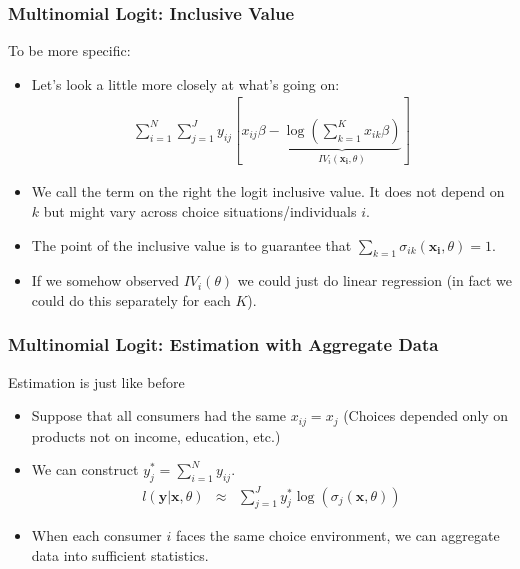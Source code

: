 \documentclass[aspectratio=169,11pt]{beamer}
\begin{document}
\begin{frame}
\frametitle{Multinomial Logit: Inclusive Value}
To be more specific:
\begin{itemize}
\item Let's look a little more closely at what's going on:
\begin{eqnarray*}
\sum_{i=1}^N \sum_{j=1}^J  y_{ij} \left[ x_{ij} \beta - \underbrace{\log \left(\sum_{k=1}^K x_{ik} \beta  \right)}_{IV_i(\symbf{x_i},\theta)} \right]
\end{eqnarray*}
\item We call the term on the right the \alert{logit inclusive value}. It does not depend on $k$ but might vary across choice situations/individuals $i$.
\item The point of the inclusive value is to guarantee that $\sum_{k=1} \sigma_{ik}(\symbf{x_i},\theta) = 1$.
\item If we somehow observed $IV_i(\theta)$ we could just do linear regression (in fact we could do this separately for each $K$).
\end{itemize}
\end{frame}


\begin{frame}
\frametitle{Multinomial Logit: Estimation with Aggregate Data}
Estimation is just like before
\begin{itemize}
\item  Suppose that all consumers had the same $x_{ij} = x_{j}$ (Choices depended only on products not on income, education, etc.)
\item We can construct $y_{j}^* = \sum_{i=1}^N y_{ij}$.
\begin{eqnarray*}
l(\symbf{y} | \symbf{x}, \theta) &\approx& \sum_{j=1}^J  y_{j}^{*} \log( \sigma_{j}(\symbf{x},\theta))
\end{eqnarray*}
\item When each consumer $i$ faces the same choice environment, we can aggregate data into \alert{sufficient statistics}.
\end{itemize}
\end{frame}
\end{document}
